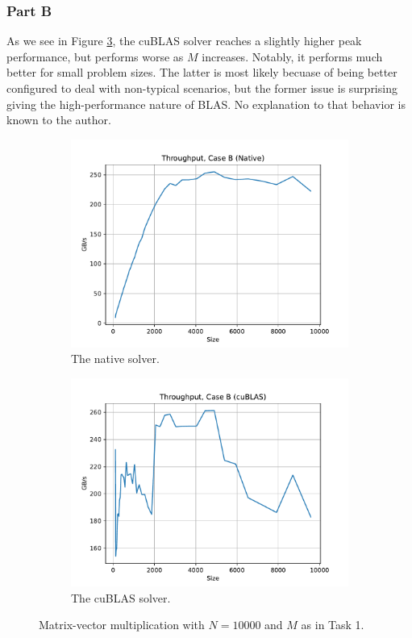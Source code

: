 \documentclass[9pt]{article}
\begin{document}
\subsubsection{Part B}
As we see in Figure \ref{fig:case_b_mv_mult}, the cuBLAS solver reaches a slightly higher peak performance, but performs worse as $M$ increases. Notably, it performs much better for small problem sizes. The latter is most likely becuase of being better configured to deal with non-typical scenarios, but the former issue is surprising giving the high-performance nature of BLAS. No explanation to that behavior is known to the author.
\begin{figure}[!ht]
    \centering
    \begin{subfigure}[b]{0.49\textwidth}
        \centering
        \includegraphics[width=\linewidth]{figs/case_b_native.pdf}
        \caption{The native solver.}
        \label{fig:case_b_native}
    \end{subfigure}\hfill
    \begin{subfigure}[b]{0.49\textwidth}
        \centering
        \includegraphics[width=\linewidth]{figs/case_b_cublas.pdf}
	\caption{The cuBLAS solver.}
	\label{fig:case_b_cublas}
    \end{subfigure}\hfill
    \caption{Matrix-vector multiplication with $N=10000$ and $M$ as in Task 1.}
    \label{fig:case_b_mv_mult}
\end{figure}
\end{document}
